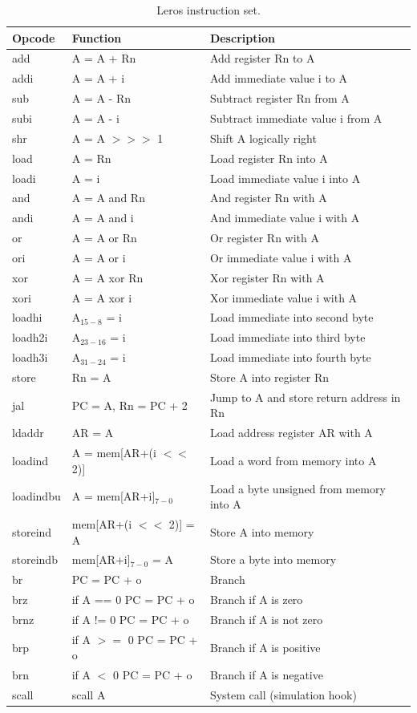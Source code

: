 \documentclass[%
    10pt,
    headinclude, footexclude,
    openright, %
    notitlepage,
    cleardoubleempty,
    headsepline,
    pointlessnumbers,
    bibtotoc, idxtotoc,
    ]{scrbook}
\begin{document}
\begin{table}
\centering
\begin{tabular}{lll}
\toprule
Opcode & Function & Description\\
\midrule
add & A = A + Rn & Add register Rn to A \\
addi & A = A + i & Add immediate value i to A \\
sub & A = A - Rn & Subtract register Rn from A \\
subi & A = A - i & Subtract immediate value i from A \\
shr & A = A $>>>$ 1 & Shift A logically right \\
load & A = Rn & Load register Rn into A \\
loadi & A = i & Load immediate value i into A \\
and & A = A and Rn & And register Rn with A \\
andi & A = A and i & And immediate value i with A \\
or & A = A or Rn & Or register Rn with A \\
ori & A = A or i & Or immediate value i with A \\
xor & A = A xor Rn & Xor register Rn with A \\
xori & A = A xor i & Xor immediate value i with A \\
loadhi & A$_{15-8}$ = i & Load immediate into second byte \\
loadh2i & A$_{23-16}$ = i  & Load immediate into third byte \\
loadh3i & A$_{31-24}$ = i & Load immediate into fourth byte \\
store & Rn = A & Store A into register Rn \\
jal & PC = A, Rn = PC + 2 & Jump to A and store return address in Rn \\
ldaddr & AR = A & Load address register AR with A \\
loadind & A = mem[AR+(i $<<$ 2)] & Load a word from memory into A \\
loadindbu & A = mem[AR+i]$_{7-0}$  &  Load a byte unsigned from memory into A\\
storeind & mem[AR+(i $<<$ 2)] = A & Store A into memory \\
storeindb & mem[AR+i]$_{7-0}$ = A & Store a byte into memory \\
br & PC = PC + o & Branch \\
brz & if A == 0 PC = PC + o & Branch if A is zero \\
brnz & if A != 0 PC = PC + o  & Branch if A is not zero \\
brp & if A $>=$ 0 PC = PC + o & Branch if A is positive \\
brn & if A $<$ 0 PC = PC + o & Branch if A is negative \\
scall & scall A & System call (simulation hook) \\
\bottomrule
\end{tabular}
\caption{Leros instruction set.}
\label{tab:leros:isa}
\end{table}
\end{document}

